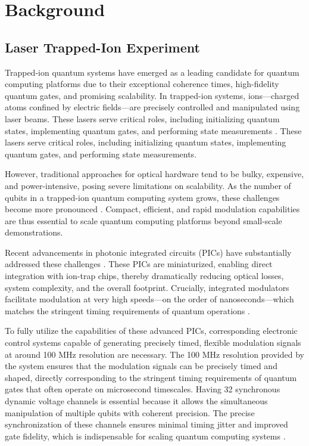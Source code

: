 \chapter{Background}

\section{Laser Trapped-Ion Experiment}

Trapped-ion quantum systems have emerged as a leading candidate for quantum computing platforms due to their exceptional coherence times, high-fidelity quantum gates, and promising scalability. In trapped-ion systems, ions—charged atoms confined by electric fields—are precisely controlled and manipulated using laser beams. These lasers serve critical roles, including initializing quantum states, implementing quantum gates, and performing state measurements \cite{naturequantuminfo}. These lasers serve critical roles, including initializing quantum states, implementing quantum gates, and performing state measurements.

However, traditional approaches for optical hardware tend to be bulky, expensive, and power-intensive, posing severe limitations on scalability. As the number of qubits in a trapped-ion quantum computing system grows, these challenges become more pronounced \cite{photonicreview}. Compact, efficient, and rapid modulation capabilities are thus essential to scale quantum computing platforms beyond small-scale demonstrations.

Recent advancements in photonic integrated circuits (PICs) have substantially addressed these challenges \cite{apic}. These PICs are miniaturized, enabling direct integration with ion-trap chips, thereby dramatically reducing optical losses, system complexity, and the overall footprint. Crucially, integrated modulators facilitate modulation at very high speeds—on the order of nanoseconds—which matches the stringent timing requirements of quantum operations \cite{naturequantuminfo}.

To fully utilize the capabilities of these advanced PICs, corresponding electronic control systems capable of generating precisely timed, flexible modulation signals at around 100 MHz resolution are necessary. The 100 MHz resolution provided by the system ensures that the modulation signals can be precisely timed and shaped, directly corresponding to the stringent timing requirements of quantum gates that often operate on microsecond timescales. Having 32 synchronous dynamic voltage channels is essential because it allows the simultaneous manipulation of multiple qubits with coherent precision. The precise synchronization of these channels ensures minimal timing jitter and improved gate fidelity, which is indispensable for scaling quantum computing systems \cite{manychanfpgactrlsys}.

